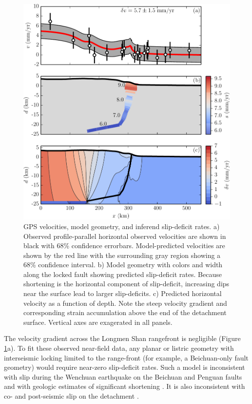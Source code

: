 \documentclass[draft,jgrga]{agutex}
\begin{document}
\begin{article}
\begin{figure}[h!]
    \centering
    \includegraphics{figs/stack_figure_all_details.pdf}
    \caption{GPS velocities, model geometry, and inferend slip-deficit rates. a) Observed profile-parallel horizontal observed velocities are shown in black with 68\% confidence errorbars. Model-predicted velocities are shown by the red line with the surrounding gray region showing a 68\% confidence interval. b) Model geometry with colors and width along the locked fault showing predicted slip-deficit rates. Because shortening is the horizontal component of slip-deficit, increasing dips near the surface lead to larger slip-deficits. c) Predicted horizontal velocity as a function of depth. Note the steep velocity gradient and corresponding strain accumulation above the end of the detachment surface. Vertical axes are exagerated in all panels.}
    \label{fig:big_stack}
\end{figure}

The velocity gradient across the Longmen Shan rangefront is negligible (Figure \ref{fig:big_stack}a). To fit these observed near-field data, any planar or listric geometry with interseismic locking limited to the range-front (for example, a Beichuan-only fault geometry) would require near-zero slip-deficit rates. Such a model is inconsistent with slip during the Wenchuan earthquake on the Beichuan and Penguan faults and with geologic estimates of significant shortening \citep{Hubbard2010, Li2010a, Wang2013, Wang2014}. It is also inconsistent with co- and post-seismic slip on the detachment \citep{Qi2011, Fielding2013b}.


\end{article}
\end{document}
